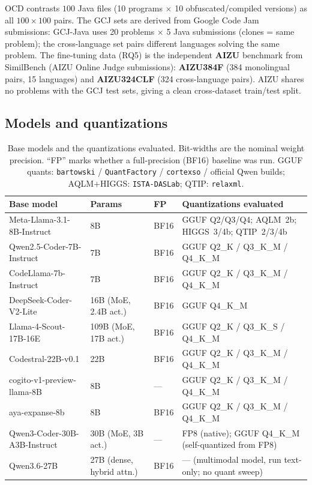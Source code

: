 \documentclass[11pt]{article}
\begin{document}
\noindent OCD contrasts $100$ Java files (10 programs $\times$ 10
obfuscated/compiled versions) as all $100\times100$ pairs. The GCJ sets are
derived from Google Code Jam submissions: GCJ-Java uses 20 problems $\times$ 5
Java submissions (clones = same problem); the cross-language set pairs different
languages solving the same problem. The fine-tuning data (RQ5) is the
independent \textbf{AIZU} benchmark from SimilBench (AIZU Online Judge
submissions): \textbf{AIZU384F} (384 monolingual pairs, 15 languages) and
\textbf{AIZU324CLF} (324 cross-language pairs). AIZU shares no problems with the
GCJ test sets, giving a clean cross-dataset train/test split.

\subsection{Models and quantizations}
\begin{table}[htbp]
  \centering
  \caption{Base models and the quantizations evaluated. Bit-widths are the
           nominal weight precision. ``FP'' marks whether a full-precision
           (BF16) baseline was run. GGUF quants: \texttt{bartowski} /
           \texttt{QuantFactory} / \texttt{cortexso} / official Qwen builds;
           AQLM+HIGGS: \texttt{ISTA-DASLab}; QTIP: \texttt{relaxml}.}
  \label{tab:models}
  \small
  \begin{tabular}{llll}
    \toprule
    \textbf{Base model} & \textbf{Params} & \textbf{FP} & \textbf{Quantizations evaluated} \\
    \midrule
    Meta-Llama-3.1-8B-Instruct     & 8B            & BF16 & GGUF Q2/Q3/Q4; AQLM~2b; HIGGS~3/4b; QTIP~2/3/4b \\
    Qwen2.5-Coder-7B-Instruct      & 7B            & BF16 & GGUF Q2\_K / Q3\_K\_M / Q4\_K\_M \\
    CodeLlama-7b-Instruct          & 7B            & BF16 & GGUF Q2\_K / Q3\_K\_M / Q4\_K\_M \\
    DeepSeek-Coder-V2-Lite         & 16B (MoE, 2.4B act.) & BF16 & GGUF Q4\_K\_M \\
    Llama-4-Scout-17B-16E          & 109B (MoE, 17B act.) & BF16 & GGUF Q2\_K / Q3\_K\_S / Q4\_K\_M \\
    Codestral-22B-v0.1             & 22B           & BF16 & GGUF Q2\_K / Q3\_K\_M / Q4\_K\_M \\
    cogito-v1-preview-llama-8B     & 8B            & ---  & GGUF Q2\_K / Q3\_K\_M / Q4\_K\_M \\
    aya-expanse-8b                 & 8B            & BF16 & GGUF Q2\_K / Q3\_K\_M / Q4\_K\_M \\
    Qwen3-Coder-30B-A3B-Instruct   & 30B (MoE, 3B act.) & --- & FP8 (native); GGUF Q4\_K\_M (self-quantized from FP8) \\
    Qwen3.6-27B                    & 27B (dense, hybrid attn.) & BF16 & --- (multimodal model, run text-only; no quant sweep) \\
    \bottomrule
  \end{tabular}
\end{table}
\end{document}
